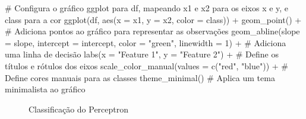 \documentclass[
  a4paperpaper,
]{article}
\newenvironment{Shaded}{\begin{snugshade}}{\end{snugshade}}
\newcommand{\AttributeTok}[1]{\textcolor[rgb]{0.40,0.45,0.13}{#1}}
\newcommand{\CommentTok}[1]{\textcolor[rgb]{0.37,0.37,0.37}{#1}}
\newcommand{\DecValTok}[1]{\textcolor[rgb]{0.68,0.00,0.00}{#1}}
\newcommand{\FunctionTok}[1]{\textcolor[rgb]{0.28,0.35,0.67}{#1}}
\newcommand{\NormalTok}[1]{\textcolor[rgb]{0.00,0.23,0.31}{#1}}
\newcommand{\SpecialCharTok}[1]{\textcolor[rgb]{0.37,0.37,0.37}{#1}}
\newcommand{\StringTok}[1]{\textcolor[rgb]{0.13,0.47,0.30}{#1}}
\begin{document}
\begin{Shaded}
\begin{Highlighting}[]
\CommentTok{\# Configura o gráfico ggplot para \textquotesingle{}df\textquotesingle{}, mapeando \textquotesingle{}x1\textquotesingle{} e \textquotesingle{}x2\textquotesingle{} para os eixos x e y, e \textquotesingle{}class\textquotesingle{} para a cor}
\FunctionTok{ggplot}\NormalTok{(df, }\FunctionTok{aes}\NormalTok{(}\AttributeTok{x =}\NormalTok{ x1, }\AttributeTok{y =}\NormalTok{ x2, }\AttributeTok{color =}\NormalTok{ class)) }\SpecialCharTok{+}
  \FunctionTok{geom\_point}\NormalTok{() }\SpecialCharTok{+}  \CommentTok{\# Adiciona pontos ao gráfico para representar as observações}
  \FunctionTok{geom\_abline}\NormalTok{(}\AttributeTok{slope =}\NormalTok{ slope, }\AttributeTok{intercept =}\NormalTok{ intercept, }\AttributeTok{color =} \StringTok{"green"}\NormalTok{, }\AttributeTok{linewidth =} \DecValTok{1}\NormalTok{) }\SpecialCharTok{+}  \CommentTok{\# Adiciona uma linha de decisão}
  \FunctionTok{labs}\NormalTok{(}\AttributeTok{x =} \StringTok{"Feature 1"}\NormalTok{, }\AttributeTok{y =} \StringTok{"Feature 2"}\NormalTok{) }\SpecialCharTok{+}  \CommentTok{\# Define os títulos e rótulos dos eixos}
  \FunctionTok{scale\_color\_manual}\NormalTok{(}\AttributeTok{values =} \FunctionTok{c}\NormalTok{(}\StringTok{"red"}\NormalTok{, }\StringTok{"blue"}\NormalTok{)) }\SpecialCharTok{+}  \CommentTok{\# Define cores manuais para as classes}
  \FunctionTok{theme\_minimal}\NormalTok{()  }\CommentTok{\# Aplica um tema minimalista ao gráfico}
\end{Highlighting}
\end{Shaded}

\begin{figure}[H]


\caption{\label{fig-perceptron}Classificação do Perceptron}

\end{figure}%
\end{document}
